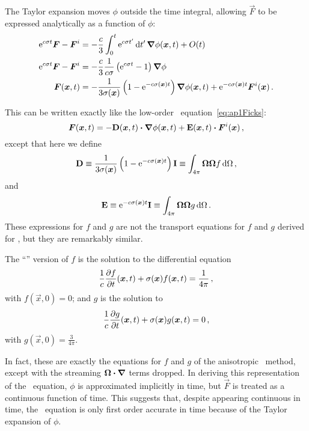 The Taylor expansion moves $\phi$ outside the time integral, allowing
$\vec{F}$ to be expressed analytically as a function of $\phi$:
\begin{align*}
  \mathop{}\!\mathrm{e}^{c \sigma t} \bm{F} - \bm{F}^i
  &= - \frac{c}{3} \int_0^{t} \mathop{}\!\mathrm{e}^{c \sigma t'} \mathop{}\!\mathrm{d} t'\, \bm{\nabla} \phi(\bm{x}, t)
  + O(t)
  \\
  \mathop{}\!\mathrm{e}^{c \sigma t} \bm{F} - \bm{F}^i
  &= - \frac{c}{3} \frac{1}{c \sigma}  \left( \mathop{}\!\mathrm{e}^{c \sigma t} - 1 \right) \bm{\nabla} \phi
  \\
  \bm{F}(\bm{x},t)
  &= - \frac{1}{3\sigma(\bm{x})}
  \left(1 - \mathop{}\!\mathrm{e}^{-c \sigma(\bm{x}) t} \right) \bm{\nabla} \phi(\bm{x}, t)
  + \mathop{}\!\mathrm{e}^{-c \sigma(\bm{x}) t} \bm{F}^i(\bm{x}) \,.
\end{align*}

This can be written exactly like the low-order \APone\
equation~\eqref{eq:ap1Ficks}:
\begin{equation*}
  \bm{F}(\bm{x}, t)
= - \mathbf{D}(\bm{x},t) \bm{\cdot} \bm{\nabla} \phi(\bm{x},t)
  + \mathbf{E}(\bm{x},t) \bm{\cdot} \bm{F}^i(\bm{x})\,,
\end{equation*}
except that here we define
\begin{equation*}
  \mathbf{D} \equiv
  \frac{1}{3\sigma(\bm{x})} \left(1 - \mathop{}\!\mathrm{e}^{-c \sigma(\bm{x}) t} \right)
  \mathbf{I}
  \equiv \int_{4\pi} \bm{\Omega}\bm{\Omega} f \mathop{}\!\mathrm{d} \Omega \,,
\end{equation*}
and
\begin{equation*}
  \mathbf{E} \equiv
  \mathop{}\!\mathrm{e}^{-c \sigma(\bm{x}) t} \mathbf{I}
  \equiv \int_{4\pi} \bm{\Omega}\bm{\Omega} g \mathop{}\!\mathrm{d} \Omega \,.
\end{equation*}
These expressions for $f$ and $g$ are not the transport equations for $f$ and
$g$ derived for \APone, but they are remarkably similar.

The ``\Pone'' version of $f$ is the solution to the differential equation
\begin{equation*}
  \frac{1}{c} \frac{\partial f}{\partial t}(\bm{x},t) + \sigma(\bm{x}) f(\bm{x},t) =
  \frac{1}{4\pi}\,,
\end{equation*}
with $f(\vec{x},0)=0$; and $g$ is the solution to
\begin{equation*}
  \frac{1}{c} \frac{\partial g}{\partial t}(\bm{x},t) + \sigma(\bm{x}) g(\bm{x},t) = 0\,,
\end{equation*}
with $g(\vec{x},0)=\frac{3}{4\pi}$.

In fact, these are exactly the equations for $f$ and $g$ of the anisotropic
\Pone\ method, except with the streaming $\bm{\Omega}\bm{\cdot} \bm{\nabla}$ terms dropped.
In deriving this representation of the \Pone\ equation, $\phi$ is approximated 
implicitly in time, but $\vec{F}$ is treated as a continuous function of time.
This suggests that, despite appearing continuous in time, the \APone\ equation is 
only first order accurate in time because of the Taylor expansion of $\phi$.

